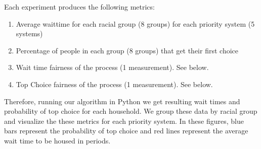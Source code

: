 \documentclass[11pt]{article}
\begin{document}
Each experiment produces the following metrics:
\begin{enumerate}
\item Average waittime for each racial group (8 groups) for each priority system (5 systems) 
\item Percentage of people in each group (8 groups) that get their first choice
\item Wait time fairness of the process (1 measurement). See below.
\item Top Choice fairness of the process (1 measurement). See below.
\end{enumerate}

Therefore, running our algorithm in Python  we get resulting wait times and probability of top choice for each household. We group these data by racial group and visualize the these metrics for each priority system.   In these figures, blue bars represent the probability of top choice and red lines represent the average wait time to be housed in periods.
\end{document}
